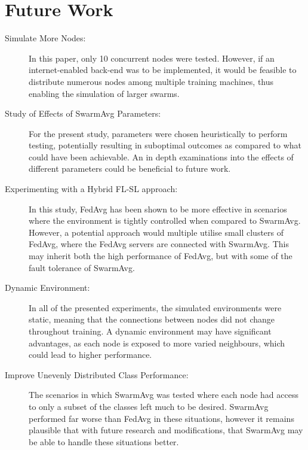 \section{Future Work}
\begin{description}
	\item[Simulate More Nodes:] In this paper, only 10 concurrent nodes were tested. However, if an internet-enabled back-end was to be implemented, it would be feasible to distribute numerous nodes among multiple training machines, thus enabling the simulation of larger swarms.
	\item[Study of Effects of SwarmAvg Parameters: ] For the present study, parameters were chosen heuristically to perform testing, potentially resulting in suboptimal outcomes as compared to what could have been achievable. An in depth examinations into the effects of different parameters could be beneficial to future work.
	\item[Experimenting with a Hybrid FL-SL approach: ] In this study, FedAvg has been shown to be more effective in scenarios where the environment is tightly controlled when compared to SwarmAvg. However, a potential approach would multiple utilise small clusters of FedAvg, where the FedAvg servers are connected with SwarmAvg. This may inherit both the high performance of FedAvg, but with some of the fault tolerance of SwarmAvg.
	\item[Dynamic Environment: ] In all of the presented experiments, the simulated environments were static, meaning that the connections between nodes did not change throughout training. A dynamic environment may have significant advantages, as each node is exposed to more varied neighbours, which could lead to higher performance.
	\item[Improve Unevenly Distributed Class Performance: ] The scenarios in which SwarmAvg was tested where each node had access to only a subset of the classes left much to be desired. SwarmAvg performed far worse than FedAvg in these situations, however it remains plausible that with future research and modifications, that SwarmAvg may be able to handle these situations better.
\end{description}
